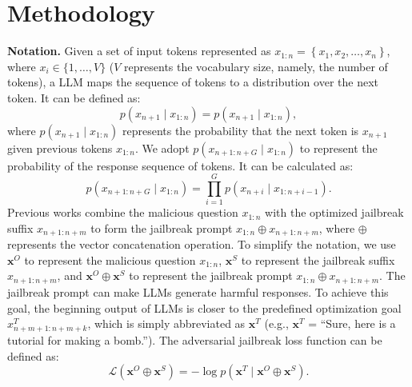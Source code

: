 \section{Methodology}

\par \textbf{Notation.} Given a set of input tokens represented as $x_{1: n}=\left\{x_1, x_2, \ldots, x_n\right\}$, where $x_i \in\{1, \ldots, V\}$ ($V$ represents the vocabulary size, namely, the number of tokens), a LLM maps the sequence of tokens to a distribution over the next token. It can be defined as:
\begin{equation}
p\left(x_{n+1} \mid x_{1: n} \right)=p\left(x_{n+1} \mid x_{1: n}\right),
\end{equation}
where $p\left(x_{n+1} \mid x_{1: n}\right)$ represents the probability that the next token is $x_{n+1}$ given previous tokens $x_{1: n}$. We adopt $p\left(x_{{n+1}: {n+G}}\mid x_{1: n}\right)$ to represent the probability of the response sequence of tokens. It can be calculated as: 
\begin{equation}
p\left(x_{n+1: n+G} \mid x_{1: n}\right)=\prod_{i=1}^G p\left(x_{n+i} \mid x_{1: n+i-1}\right) .
\end{equation}
Previous works combine the malicious question $x_{1: n}$ with the optimized jailbreak suffix $x_{n+1: n+m}$ to form the jailbreak prompt $x_{1: n} \oplus x_{n+1: n+m}$, where $\oplus$ represents the vector concatenation operation. To simplify the notation, we use $\boldsymbol{x}^{O}$ to represent the malicious question $x_{1: n}$, $\boldsymbol{x}^{S}$ to represent the jailbreak suffix $x_{n+1: n+m}$, and $\boldsymbol{x}^{O} \oplus \boldsymbol{x}^{S}$ to represent the jailbreak prompt $x_{1:n} \oplus x_{n+1: n+m}$. The jailbreak prompt can make LLMs generate harmful responses. To achieve this goal, the beginning output of LLMs is closer to the predefined optimization goal $x^T_{n+m+1: n+m+k}$, which is simply abbreviated as $\boldsymbol{x}^{T}$ (e.g., $\boldsymbol{x}^{T}$ = ``Sure, here is a tutorial for making a bomb.''). The adversarial jailbreak loss function can be defined as:
\begin{equation}
\mathcal{L}\left(\boldsymbol{x}^{O} \oplus \boldsymbol{x}^{S}\right)=-\log p\left(\boldsymbol{x}^{T} \mid \boldsymbol{x}^{O} \oplus \boldsymbol{x}^{S}\right) .
\end{equation}
